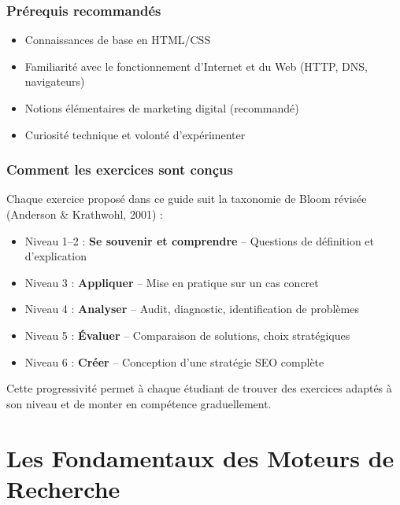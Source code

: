\documentclass[12pt,a4paper,twoside]{report}
\begin{document}
\section*{Prérequis recommandés}
\begin{itemize}
    \item Connaissances de base en HTML/CSS
    \item Familiarité avec le fonctionnement d'Internet et du Web (HTTP, DNS, navigateurs)
    \item Notions élémentaires de marketing digital (recommandé)
    \item Curiosité technique et volonté d'expérimenter
\end{itemize}

\section*{Comment les exercices sont conçus}

Chaque exercice proposé dans ce guide suit la taxonomie de Bloom révisée (Anderson \& Krathwohl, 2001) :
\begin{itemize}
    \item Niveau 1--2 : \textbf{Se souvenir et comprendre} -- Questions de définition et d'explication
    \item Niveau 3 : \textbf{Appliquer} -- Mise en pratique sur un cas concret
    \item Niveau 4 : \textbf{Analyser} -- Audit, diagnostic, identification de problèmes
    \item Niveau 5 : \textbf{Évaluer} -- Comparaison de solutions, choix stratégiques
    \item Niveau 6 : \textbf{Créer} -- Conception d'une stratégie SEO complète
\end{itemize}

Cette progressivité permet à chaque étudiant de trouver des exercices adaptés à son niveau et de monter en compétence graduellement.

\newpage

\newpage

\part{Les Fondamentaux des Moteurs de Recherche}
\label{part:fondamentaux}
\end{document}
